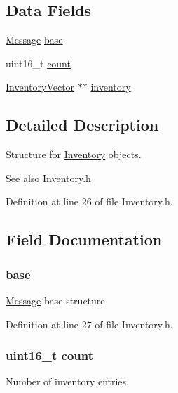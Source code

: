\subsection*{Data Fields}
\begin{DoxyCompactItemize}
\item 
\hyperlink{struct_message}{Message} \hyperlink{struct_inventory_a8987f797adf70c3e174fd64cc68bc933}{base}
\item 
uint16\_\-t \hyperlink{struct_inventory_af6a39bfc7e1dc3b6f9c997c1c43fa996}{count}
\item 
\hyperlink{struct_inventory_vector}{InventoryVector} $\ast$$\ast$ \hyperlink{struct_inventory_a5434993362e4e5b940a640f34b3c417d}{inventory}
\end{DoxyCompactItemize}


\subsection{Detailed Description}
Structure for \hyperlink{struct_inventory}{Inventory} objects. 

\begin{DoxySeeAlso}{See also}
\hyperlink{_inventory_8h}{Inventory.h} 
\end{DoxySeeAlso}


Definition at line 26 of file Inventory.h.



\subsection{Field Documentation}
\hypertarget{struct_inventory_a8987f797adf70c3e174fd64cc68bc933}{
\subsubsection[{base}]{ {\bf base}}}
\label{struct_inventory_a8987f797adf70c3e174fd64cc68bc933}
\hyperlink{struct_message}{Message} base structure 

Definition at line 27 of file Inventory.h.

\hypertarget{struct_inventory_af6a39bfc7e1dc3b6f9c997c1c43fa996}{
\subsubsection[{count}]{\setlength{\rightskip}{0pt plus 5cm}uint16\_\-t {\bf count}}}
\label{struct_inventory_af6a39bfc7e1dc3b6f9c997c1c43fa996}
Number of inventory entries. 

